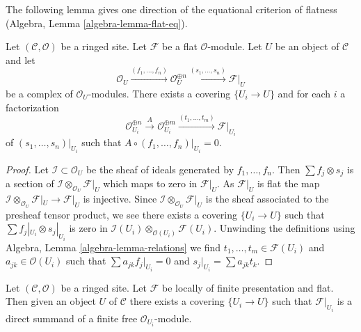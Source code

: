 \noindent
The following lemma gives one direction of the equational criterion of
flatness (Algebra, Lemma \ref{algebra-lemma-flat-eq}).

\begin{lemma}
\label{lemma-flat-eq}
Let $(\mathcal{C}, \mathcal{O})$ be a ringed site. Let $\mathcal{F}$ be a flat
$\mathcal{O}$-module. Let $U$ be an object of $\mathcal{C}$ and let
$$
\mathcal{O}_U \xrightarrow{(f_1, \ldots, f_n)}
\mathcal{O}_U^{\oplus n} \xrightarrow{(s_1, \ldots, s_n)}
\mathcal{F}|_U
$$
be a complex of $\mathcal{O}_U$-modules. There exists a covering
$\{U_i \to U\}$ and for each $i$ a factorization
$$
\mathcal{O}_{U_i}^{\oplus n}
\xrightarrow{A}
\mathcal{O}_{U_i}^{\oplus m} \xrightarrow{(t_1, \ldots, t_m)}
\mathcal{F}|_{U_i}
$$
of $(s_1, \ldots, s_n)|_{U_i}$ such that
$A \circ (f_1, \ldots, f_n)|_{U_i} = 0$.
\end{lemma}

\begin{proof}
Let $\mathcal{I} \subset \mathcal{O}_U$ be the sheaf of ideals
generated by $f_1, \ldots, f_n$. Then $\sum f_j \otimes s_j$ is
a section of $\mathcal{I} \otimes_{\mathcal{O}_U} \mathcal{F}|_U$
which maps to zero in $\mathcal{F}|_U$. As $\mathcal{F}|_U$ is flat
the map
$\mathcal{I} \otimes_{\mathcal{O}_U} \mathcal{F}|_U \to \mathcal{F}|_U$
is injective. Since $\mathcal{I} \otimes_{\mathcal{O}_U} \mathcal{F}|_U$
is the sheaf associated to the presheaf tensor product, we see
there exists a covering $\{U_i \to U\}$ such
that $\sum f_j|_{U_i} \otimes s_j|_{U_i}$ is zero in
$\mathcal{I}(U_i) \otimes_{\mathcal{O}(U_i)} \mathcal{F}(U_i)$.
Unwinding the definitions using Algebra, Lemma \ref{algebra-lemma-relations}
we find $t_1, \ldots, t_m \in \mathcal{F}(U_i)$ and
$a_{jk} \in \mathcal{O}(U_i)$
such that $\sum a_{jk}f_j|_{U_i} = 0$ and $s_j|_{U_i} = \sum a_{jk}t_k$.
\end{proof}

\begin{lemma}
\label{lemma-flat-locally-finite-presentation}
Let $(\mathcal{C}, \mathcal{O})$ be a ringed site. Let $\mathcal{F}$
be locally of finite presentation and flat. Then given an object
$U$ of $\mathcal{C}$ there exists a covering $\{U_i \to U\}$ such that
$\mathcal{F}|_{U_i}$ is a direct summand of a finite free
$\mathcal{O}_{U_i}$-module.
\end{lemma}

